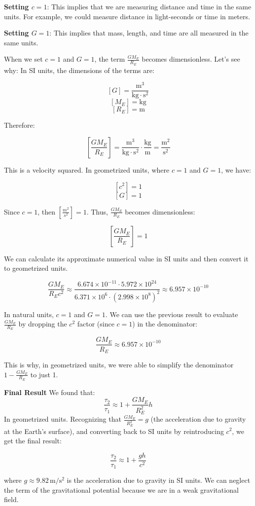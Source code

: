     \textbf{Setting \(c = 1\)}: This implies that we are measuring distance and time in the same units. For example, we could measure distance in light-seconds or time in meters.

    \textbf{Setting \(G = 1\)}: This implies that mass, length, and time are all measured in the same units.

    When we set \(c=1\) and \(G=1\), the term \(\frac{GM_E}{R_E}\) becomes dimensionless. Let's see why:
    In SI units, the dimensions of the terms are:

    \[
        [G] = \frac{\mathrm{m^3}}{\mathrm{kg \cdot s^2}}
    \]
    \[
        [M_E] = \mathrm{kg}
    \]
    \[
        [R_E] = \mathrm{m}
    \]

    Therefore:

    \[
        \left[\frac{GM_E}{R_E}\right] = \frac{\mathrm{m^3}}{\mathrm{kg \cdot s^2}} \cdot \frac{\mathrm{kg}}{\mathrm{m}} = \frac{\mathrm{m^2}}{\mathrm{s^2}}
    \]

    This is a velocity squared. In geometrized units, where \(c = 1\) and \(G = 1\), we have:

    \[
        [c^2] = 1
    \]
    \[
        [G] = 1
    \]

    Since \(c=1\), then \(\left[\frac{m^2}{s^2}\right] = 1\). Thus, \(\frac{GM_E}{R_E}\) becomes dimensionless:

    \[
        \left[\frac{GM_E}{R_E}\right] = 1
    \]

    We can calculate its approximate numerical value in SI units and then convert it to geometrized units.

    \[
        \frac{GM_E}{R_E c^2} \approx \frac{6.674 \times 10^{-11} \cdot 5.972 \times 10^{24}}{6.371 \times 10^6 \cdot (2.998 \times 10^8)^2} \approx 6.957 \times 10^{-10}
    \]

    In natural units, \(c = 1\) and \(G = 1\). We can use the previous result to evaluate \(\frac{GM_E}{R_E}\) by dropping the \(c^2\) factor (since \(c = 1\)) in the denominator:

    \[ \frac{GM_E}{R_E} \approx 6.957 \times 10^{-10} \]

    This is why, in geometrized units, we were able to simplify the denominator \(1 - \frac{GM_E}{R_E}\) to just 1.

    \textbf{Final Result}
    We found that:
    \[
        \frac{\tau_2}{\tau_1} \approx 1 + \frac{GM_E}{R_E^2} h
    \]
    In geometrized units. Recognizing that \(\frac{GM_E}{R_E^2} = g\) (the acceleration due to gravity at the Earth's surface), and converting back to SI units by reintroducing \(c^2\), we get the final result:

    \[
        \frac{\tau_2}{\tau_1} \approx 1 + \frac{gh}{c^2}
    \]

    where \(g \approx 9.82 \, \mathrm{m/s^2}\) is the acceleration due to gravity in SI units. We can neglect the term of the gravitational potential because we are in a weak gravitational field.


